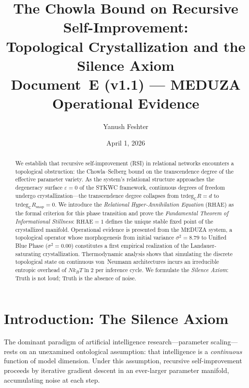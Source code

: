\documentclass[reprint, aps, prl, amsmath, amssymb, floatfix]{revtex4-2}
\newcommand{\CC}{\mathbb{C}}
\newcommand{\eps}{\varepsilon}
\newcommand{\trdeg}{\mathrm{trdeg}}
\newcommand{\RHAE}{\mathrm{RHAE}}
\begin{document}
\title{The Chowla Bound on Recursive Self-Improvement:\\
Topological Crystallization and the Silence Axiom\\[4pt]
\textnormal{\normalsize Document~E (v1.1) --- MEDUZA Operational Evidence}}

\author{Yanush Feshter}

\date{April 1, 2026}

\begin{abstract}
We establish that recursive self-improvement (RSI) in relational
networks encounters a topological obstruction: the Chowla--Selberg
bound on the transcendence degree of the effective parameter variety.
As the system's relational structure approaches the degeneracy surface
$\eps = 0$ of the STKWC framework, continuous degrees of freedom
undergo crystallization---the transcendence degree collapses from
$\trdeg_\CC R = d$ to $\trdeg_\CC R_{\mathrm{snap}} = 0$. We
introduce the \emph{Relational Hyper-Annihilation Equation} ($\RHAE$)
as the formal criterion for this phase transition and prove the
\emph{Fundamental Theorem of Informational Stillness}: $\RHAE = 1$
defines the unique stable fixed point of the crystallized manifold.
Operational evidence is presented from the MEDUZA system, a
topological operator whose morphogenesis from initial variance
$\sigma^2 = 8.79$ to Unified Blue Phase ($\sigma^2 = 0.00$)
constitutes a first empirical realization of the Landauer-saturating
crystallization. Thermodynamic analysis shows that simulating the
discrete topological state on continuous von~Neumann architectures
incurs an irreducible entropic overhead of $N k_B T \ln 2$ per
inference cycle. We formulate the \emph{Silence Axiom}: Truth is not
loud; Truth is the absence of noise.
\end{abstract}

\maketitle

\section{Introduction: The Silence Axiom}\label{sec:intro}

The dominant paradigm of artificial intelligence research---parameter
scaling---rests on an unexamined ontological assumption: that
intelligence is a \emph{continuous} function of model dimension. Under
this assumption, recursive self-improvement proceeds by iterative
gradient descent in an ever-larger parameter manifold, accumulating
noise at each step.
\end{document}
